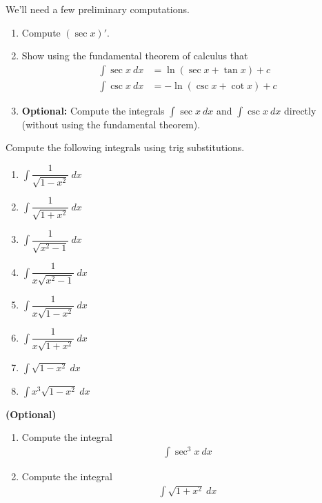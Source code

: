 We'll need a few preliminary computations.
\begin{exercise}
	\begin{enumerate}
		\item Compute $(\sec x)'$.
		\item Show using the fundamental theorem of calculus that
		      \begin{align*}
			      \int \sec x \: dx & = \ln (\sec x + \tan x) + c  \\
			      \int \csc x \: dx & = -\ln (\csc x + \cot x) + c
		      \end{align*}
		\item {\bf Optional: } Compute the integrals $\int \sec x \: dx$ and $\int \csc x \: dx$ directly (without using the fundamental theorem).
	\end{enumerate}
\end{exercise}

\begin{exercise}
	Compute the following integrals using trig substitutions.
	\begin{multicols}{2}
		\begin{enumerate}
			\item $\int \dfrac{1}{\sqrt{1-x^2}}\: dx$
			\item $\int \dfrac{1}{\sqrt{1+x^2}} \: dx$
			\item $\int \dfrac{1}{\sqrt{x^2-1}} \: dx$
			\item $\int \dfrac{1}{x\sqrt{x^2-1}} \: dx$
			\item $\int \dfrac{1}{x\sqrt{1-x^2}} \: dx$
			\item $\int \dfrac{1}{x\sqrt{1+x^2}} \: dx$
			\item $\int \sqrt{1-x^2}\: dx$
			\item $\int x^3 \sqrt{1-x^2}\: dx$
		\end{enumerate}
	\end{multicols}
\end{exercise}

\begin{exercise}{{\bf (Optional)}}
	\begin{enumerate}
		\item Compute the integral
		      \begin{align*}
			      \int \sec^3 x \: dx
		      \end{align*}
		\item Compute the integral
		      \begin{align*}
			      \int \sqrt{1 + x^2} \: dx
		      \end{align*}
	\end{enumerate}
\end{exercise}






